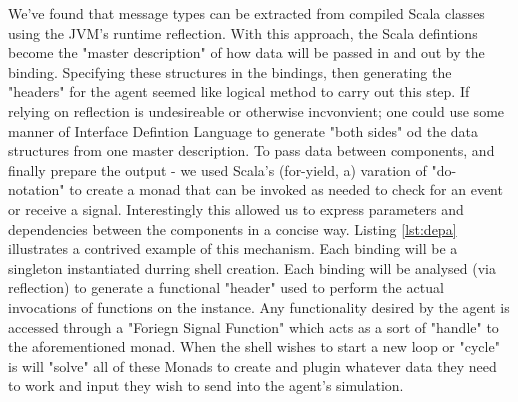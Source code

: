 We've found that message types can be extracted from compiled Scala classes using the JVM's runtime reflection.
    With this approach, the Scala defintions become the "master description" of how data will be passed in and out by the binding.
        Specifying these structures in the bindings, then generating the "headers" for the agent seemed like logical method to carry out this step.
        If relying on reflection is undesireable or otherwise incvonvient; one could use some manner of Interface Defintion Language to generate "both sides" od the data structures from one master description.
To pass data between components, and finally prepare the output - we used Scala's (for-yield, a) varation of "do-notation" to create a monad that can be invoked as needed to check for an event or receive a signal.
    Interestingly this allowed us to express parameters and dependencies between the components in a concise way.
    Listing \ref{lst:depa} illustrates a contrived example of this mechanism.
Each binding will be a singleton instantiated durring shell creation.
    Each binding will be analysed (via reflection) to generate a functional "header" used to perform the actual invocations of functions on the instance.
    Any functionality desired by the agent is accessed through a "Foriegn Signal Function" which acts as a sort of "handle" to the aforementioned monad.
    When the shell wishes to start a new loop or "cycle" is will "solve" all of these Monads to create and plugin whatever data they need to work and input they wish to send into the agent's simulation.


